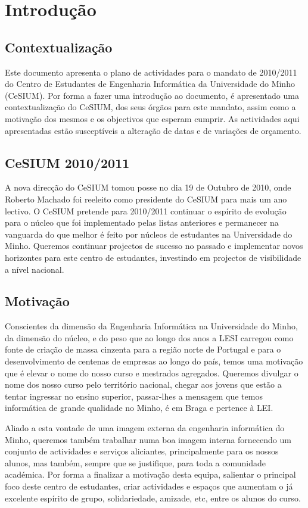 \section{Introdução}

\subsection{Contextualização}
\indent Este documento apresenta o plano de actividades para o mandato de 2010/2011 do Centro de Estudantes de Engenharia Informática da Universidade do Minho (CeSIUM). Por forma a fazer uma introdução ao documento, é apresentado uma contextualização do CeSIUM, dos seus órgãos para este mandato, assim como a motivação dos mesmos e os objectivos que esperam cumprir. As actividades aqui apresentadas estão susceptíveis a alteração de datas e de variações de orçamento.

\subsection{CeSIUM 2010/2011}
\indent A nova direcção do CeSIUM tomou posse no dia 19 de Outubro de 2010, onde Roberto Machado foi reeleito como presidente do CeSIUM para mais um ano lectivo. O CeSIUM pretende para 2010/2011 continuar o espírito de evolução para o núcleo que foi implementado pelas listas anteriores e permanecer na vanguarda do que melhor é feito por núcleos de estudantes na Universidade do Minho. Queremos continuar projectos de sucesso no passado e implementar novos horizontes para este centro de estudantes, investindo em projectos de visibilidade a nível nacional.

\subsection{Motivação}
\indent Conscientes da dimensão da Engenharia Informática na Universidade do Minho, da dimensão do núcleo, e do peso que ao longo dos anos a LESI carregou como fonte de criação de massa cinzenta para a região norte de Portugal e para o desenvolvimento de centenas de empresas ao longo do país, temos uma motivação que é elevar o nome do nosso curso e mestrados agregados. Queremos divulgar o nome dos nosso curso pelo território nacional, chegar aos jovens que estão a tentar ingressar no ensino superior, passar-lhes a mensagem que temos informática de grande qualidade no Minho, é em Braga e pertence à LEI. 

\indent Aliado a esta vontade de uma imagem externa da engenharia informática do Minho, queremos também trabalhar numa boa imagem interna fornecendo um conjunto de actividades e serviços aliciantes, principalmente para os nossos alunos, mas também, sempre que se justifique, para toda a comunidade académica. Por forma a finalizar a motivação desta equipa, salientar o principal foco deste centro de estudantes, criar actividades e espaços que aumentam o já excelente espírito de grupo, solidariedade, amizade, etc, entre os alunos do curso.

